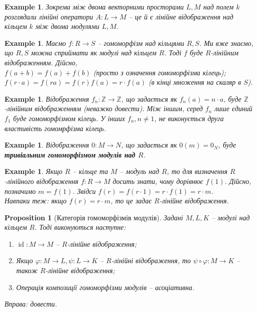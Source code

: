 \documentclass[a4paper, 10pt]{article}
\theoremstyle{theoremdd}
\theoremstyle{theoremdd}
\theoremstyle{theoremdd}
\theoremstyle{theoremdd}
\theoremstyle{theoremdd}
\newtheorem{example}[theorem]{Example}
\theoremstyle{theoremdd}
\theoremstyle{theoremdd}
\theoremstyle{theoremdd}
\theoremstyle{theoremdd}
\newtheorem{proposition}[theorem]{Proposition}
\theoremstyle{theoremdd}
\theoremstyle{theoremdd}
\theoremstyle{theoremdd}
\theoremstyle{theoremdd}
\theoremstyle{theoremdd}
\theoremstyle{theoremdd}
\DeclareMathOperator{\id}{id}
\begin{document}
\begin{example}
Зокрема між двома векторними просторами $L,M$ над полем $k$ розглядали лінійні оператори $A \colon L \to M$ -- це й є лінійне відображення над кільцем $k$ між двома модулями $L,M$.
\end{example}

\begin{example}
Маємо $f \colon R \to S$ -- гомоморфізм над кільцями $R,S$. Ми вже знаємо, що $R,S$ можна сприймати як модулі над кільцем $R$. Тоді $f$ буде $R$-лінійним відображенням. Дійсно,\\
$f(a+b) = f(a) + f(b)$ (просто з означення гомоморфізма кілець);\\
$f(r \cdot a) = f(ra) = f(r)f(a) = r \cdot f(a)$ (в кінці множення на скаляр в $S$).
\end{example}

\begin{example}
Відображення $f_n \colon \mathbb{Z} \to \mathbb{Z}$, що задається як $f_n(a) = n \cdot a$, буде $\mathbb{Z}$-лінійним відображенням (неважко довести). Між іншим, серед $f_n$ лише єдиний $f_1$ буде гомоморфізмом кілець. У інших $f_n, n \neq 1$, не виконується друга властивість гомомрфізма кілець.
\end{example}

\begin{example}
Відображення $0 \colon M \to N$, що задається як $0(m) = 0_N$, буде \textbf{тривіальним гомоморфізмом модулів над $R$}.
\end{example}

\begin{example}
Якщо $R$ -- кільце та $M$ -- модуль над $R$, то для визначення $R$-лінійного відображення $f \colon R \to M$ досить знати, чому дорівнює $f(1)$. Дійсно, позначимо $m = f(1)$. Звідси $f(r) = f(r \cdot 1) = r \cdot f(1) = r \cdot m$.
\bigskip \\
Навпаки теж: якщо $f(r) = r \cdot m$, то це задає $R$-лінійне відображення.
\end{example}

\begin{proposition}[Категорія гомоморфізмів модулів]
Задані $M,L,K$ -- модулі над кільцем $R$. Тоді виконуються наступне:
\begin{enumerate}[nosep,wide=0pt,label={\arabic*)}]
\item $\id \colon M \to M$ -- $R$-лінійне відображення;
\item Якщо $\varphi \colon M \to L, \psi \colon L \to K$ -- $R$-лінійні відображення, то $\psi \circ \varphi \colon M \to K$ -- також $R$-лінійне відображення;
\item Операція композиції гомоморфізми модулів -- асоціативна.
\end{enumerate}
\textit{Вправа: довести.}
\end{proposition}
\end{document}

